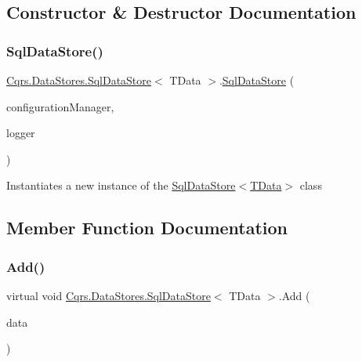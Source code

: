 \subsection{Constructor \& Destructor Documentation}
\mbox{\label{classCqrs_1_1DataStores_1_1SqlDataStore_a0ce9b3f74799e463d4f53eda386d5577}} 
\subsubsection{\texorpdfstring{Sql\+Data\+Store()}{SqlDataStore()}}
{\footnotesize\ttfamily \hyperlink{classCqrs_1_1DataStores_1_1SqlDataStore}{Cqrs.\+Data\+Stores.\+Sql\+Data\+Store}$<$ T\+Data $>$.\hyperlink{classCqrs_1_1DataStores_1_1SqlDataStore}{Sql\+Data\+Store} (\begin{DoxyParamCaption}\item[{\hyperlink{interfaceCqrs_1_1Configuration_1_1IConfigurationManager}{I\+Configuration\+Manager}}]{configuration\+Manager,  }\item[{I\+Logger}]{logger }\end{DoxyParamCaption})}



Instantiates a new instance of the \hyperlink{classCqrs_1_1DataStores_1_1SqlDataStore_a0ce9b3f74799e463d4f53eda386d5577}{Sql\+Data\+Store$<$\+T\+Data$>$} class 



\subsection{Member Function Documentation}
\mbox{\label{classCqrs_1_1DataStores_1_1SqlDataStore_abcca53d2e93dbdfb193a9fb0996849c5}} 
\subsubsection{\texorpdfstring{Add()}{Add()}\hspace{0.1cm}{\footnotesize\ttfamily [1/2]}}
{\footnotesize\ttfamily virtual void \hyperlink{classCqrs_1_1DataStores_1_1SqlDataStore}{Cqrs.\+Data\+Stores.\+Sql\+Data\+Store}$<$ T\+Data $>$.Add (\begin{DoxyParamCaption}\item[{T\+Data}]{data }\end{DoxyParamCaption})\hspace{0.3cm}{\ttfamily [virtual]}}



